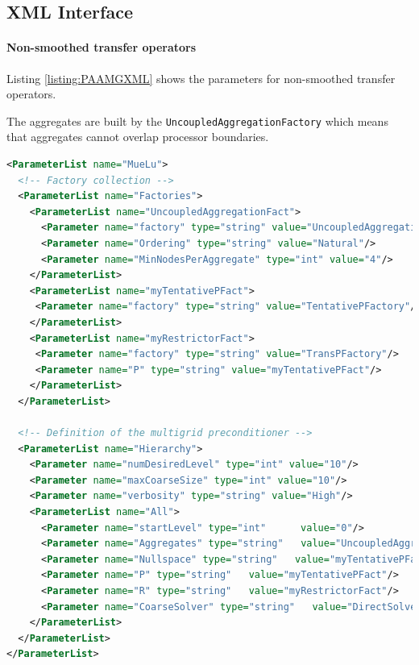 \documentclass[12pt,a4paper]{article}
\newcommand{\MueLu}{MueLu}
\begin{document}
\subsection{XML Interface}

\paragraph{Non-smoothed transfer operators}

Listing \ref{listing:PAAMGXML} shows the parameters for non-smoothed transfer operators. 

The aggregates are built by the \verb|UncoupledAggregationFactory| which means that aggregates cannot overlap processor boundaries.

\begin{Listing} 
\begin{center} 
\begin{lstlisting}[language=XML,label=listing:PAXML]
<ParameterList name="MueLu">
  <!-- Factory collection -->
  <ParameterList name="Factories">
    <ParameterList name="UncoupledAggregationFact">
      <Parameter name="factory" type="string" value="UncoupledAggregationFactory"/>
      <Parameter name="Ordering" type="string" value="Natural"/>
      <Parameter name="MinNodesPerAggregate" type="int" value="4"/>
    </ParameterList>   
    <ParameterList name="myTentativePFact">
     <Parameter name="factory" type="string" value="TentativePFactory"/>
    </ParameterList>
    <ParameterList name="myRestrictorFact">
     <Parameter name="factory" type="string" value="TransPFactory"/>
     <Parameter name="P" type="string" value="myTentativePFact"/>
    </ParameterList>
  </ParameterList>

  <!-- Definition of the multigrid preconditioner -->
  <ParameterList name="Hierarchy">
    <Parameter name="numDesiredLevel" type="int" value="10"/>
    <Parameter name="maxCoarseSize" type="int" value="10"/>
    <Parameter name="verbosity" type="string" value="High"/>
    <ParameterList name="All">
      <Parameter name="startLevel" type="int"      value="0"/>
      <Parameter name="Aggregates" type="string"   value="UncoupledAggregationFact"/>
      <Parameter name="Nullspace" type="string"   value="myTentativePFact"/>
      <Parameter name="P" type="string"   value="myTentativePFact"/>
      <Parameter name="R" type="string"   value="myRestrictorFact"/>
      <Parameter name="CoarseSolver" type="string"   value="DirectSolver"/>
    </ParameterList>
  </ParameterList>
</ParameterList>
\end{lstlisting}
\caption{Structure of XML input file for \MueLu~ with non-smoothed aggregation transfer operators.} 
\label{listing:PAAMGXML}
\end{center}
\end{Listing}
\end{document}
